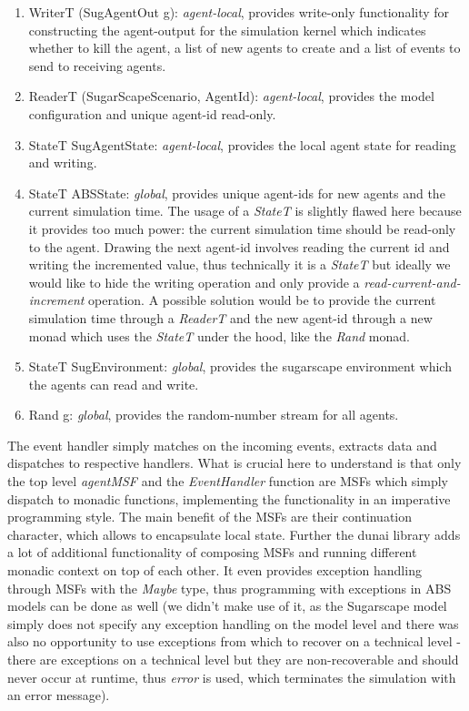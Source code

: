 \begin{enumerate}
	\item WriterT (SugAgentOut g): \textit{agent-local}, provides write-only functionality for constructing the agent-output for the simulation kernel which indicates whether to kill the agent, a list of new agents to create and a list of events to send to receiving agents.
	\item ReaderT (SugarScapeScenario, AgentId): \textit{agent-local}, provides the model configuration and unique agent-id read-only.
	\item StateT SugAgentState: \textit{agent-local}, provides the local agent state for reading and writing.
	\item StateT ABSState: \textit{global}, provides unique agent-ids for new agents and the current simulation time. The usage of a \textit{StateT} is slightly flawed here because it provides too much power: the current simulation time should be read-only to the agent. Drawing the next agent-id involves reading the current id and writing the incremented value, thus technically it is a \textit{StateT} but ideally we would like to hide the writing operation and only provide a \textit{read-current-and-increment} operation. A possible solution would be to provide the current simulation time through a \textit{ReaderT} and the new agent-id through a new monad which uses the \textit{StateT} under the hood, like the \textit{Rand} monad.
	\item StateT SugEnvironment: \textit{global}, provides the sugarscape environment which the agents can read and write.
	\item Rand g: \textit{global}, provides the random-number stream for all agents.
\end{enumerate}

The event handler simply matches on the incoming events, extracts data and dispatches to respective handlers. What is crucial here to understand is that only the top level \textit{agentMSF} and the \textit{EventHandler} function are MSFs which simply dispatch to monadic functions, implementing the functionality in an imperative programming style. The main benefit of the MSFs are their continuation character, which allows to encapsulate local state. Further the dunai library adds a lot of additional functionality of composing MSFs and running different monadic context on top of each other. It even provides exception handling through MSFs with the \textit{Maybe} type, thus programming with exceptions in ABS models can be done as well (we didn't make use of it, as the Sugarscape model simply does not specify any exception handling on the model level and there was also no opportunity to use exceptions from which to recover on a technical level - there are exceptions on a technical level but they are non-recoverable and should never occur at runtime, thus \textit{error} is used, which terminates the simulation with an error message).


